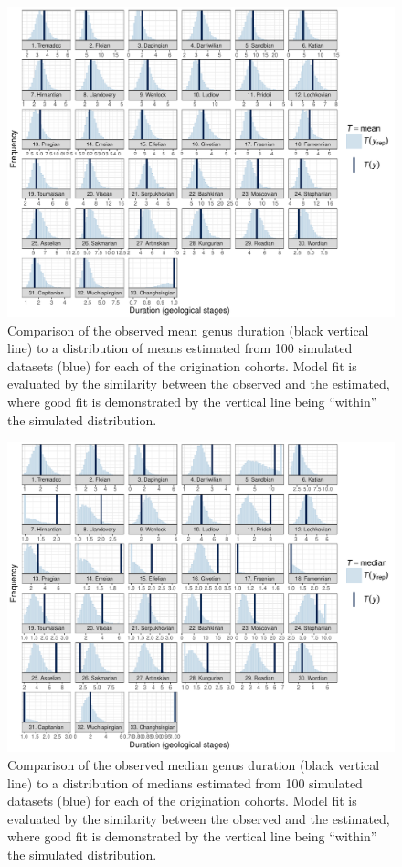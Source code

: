 \documentclass[11pt]{article}
\begin{document}
\begin{figure}[ht]
  \centering
  \includegraphics[height = 0.5\textheight,width=\textwidth,keepaspectratio=true]{figure/ppc_mean_group_cweib_cens}
  \caption{ Comparison of the observed mean genus duration (black vertical line) to a distribution of means estimated from 100 simulated datasets (blue) for each of the origination cohorts. Model fit is evaluated by the similarity between the observed and the estimated, where good fit is demonstrated by the vertical line being ``within'' the simulated distribution. }
  \label{fig:group_mean}
\end{figure}

\begin{figure}[ht]
  \centering
  \includegraphics[height = 0.5\textheight,width=\textwidth,keepaspectratio=true]{figure/ppc_med_group_cweib_cens}
  \caption{ Comparison of the observed median genus duration (black vertical line) to a distribution of medians estimated from 100 simulated datasets (blue) for each of the origination cohorts. Model fit is evaluated by the similarity between the observed and the estimated, where good fit is demonstrated by the vertical line being ``within'' the simulated distribution. }
  \label{fig:group_median}
\end{figure}
\end{document}
